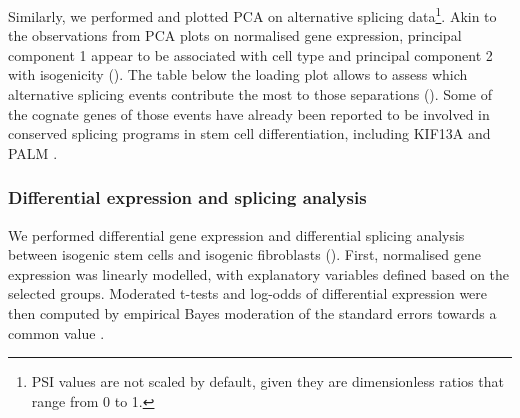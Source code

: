 Similarly, we performed and plotted PCA on alternative splicing data\footnote{PSI values are not scaled by default, given they are dimensionless ratios that range from 0 to 1.}. Akin to the observations from PCA plots on normalised gene expression, principal component 1 appear to be associated with cell type and principal component 2 with isogenicity (). The table below the loading plot allows to assess which alternative splicing events contribute the most to those separations (). Some of the cognate genes of those events have already been reported to be involved in conserved splicing programs in stem cell differentiation, including KIF13A and PALM \cite{venables:2013tz}.

\subsubsection{Differential expression and splicing analysis}

We performed differential gene expression and differential splicing analysis between isogenic stem cells and isogenic fibroblasts (). First, normalised gene expression was linearly modelled, with explanatory variables defined based on the selected groups. Moderated t-tests and log-odds of differential expression were then computed by empirical Bayes moderation of the standard errors towards a common value \cite{ritchie:2015tm}.

